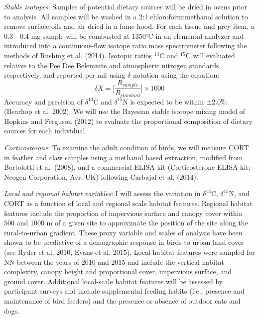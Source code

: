 \documentclass[12pt]{article}
\begin{document}
\noindent \textit{Stable isotopes}: Samples of potential dietary sources will be dried in ovens prior to analysis. All samples will be washed in a 2:1 chloroform:methanol solution to remove surface oils and air dried in a fume hood. For each tissue and prey item, a 0.3 - 0.4 mg sample will be combusted at 1350$^{\circ}$C in an elemental analyzer and introduced into a continuous-flow isotope ratio mass spectrometer following the methods of Rushing et al. (2014). Isotopic ratios $^{13}$C and $^{15}$C will evaluated relative to the Pee Dee Belemnite and atmospheric nitrogen standards, respectively, and reported per mil using $\delta$ notation using the equation: $$\delta{X} = \bigg[ \frac{R_{sample}}{R_{standard}} \bigg] \times 1000$$
\noindent Accuracy and precision of $\delta^{13}$C and   $\delta^{15}$N is expected to be within $\pm 2.0 \permil$ (Bearhop et al. 2002). We will use the Bayesian stable isotope mixing model  of Hopkins and Ferguson (2012) to evaluate the proportional composition of dietary sources for each individual. \par

\noindent \textit{Corticosterone}:  To examine the adult condition of birds, we will measure CORT in feather and claw samples using a methanol based extraction, modified from Bortolotti et al. (2008), and a commercial ELISA kit (Corticosterone ELISA kit; Neogen Corporation, Ayr, UK) following Carbajal et al. (2014). \par 

\noindent \textit{Local and regional habitat variables}: I will assess the variation in $\delta^{13}$C,  $\delta^{15}$N, and CORT as a function of local and regional scale habitat features. Regional habitat features include the proportion of impervious surface and canopy cover within 500 and 1000 m of a given site to approximate the position of the site along the rural-to-urban gradient. These proxy variable and scales of analysis have been shown to be predictive of a demographic response in birds to urban land cover (see Ryder et al. 2010, Evans et al. 2015). Local habitat features were sampled for NN between the years of 2010 and 2015 and include the vertical habitat complexity, canopy height and proportional cover, impervious surface, and ground cover. Additional local-scale habitat features will be assessed by participant surveys and include supplemental feeding habits (i.e., presence and maintenance of bird feeders) and the presence or absence of outdoor cats and dogs. \par
\end{document}
